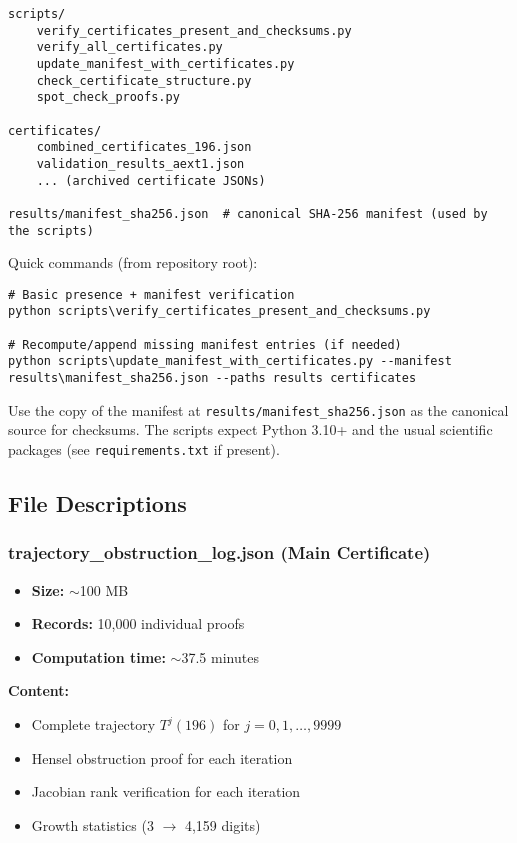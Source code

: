 \documentclass[11pt,a4paper]{article}
\theoremstyle{definition}
\begin{document}
\begin{lstlisting}[style=bashstyle,caption={Key verification paths and scripts}]
scripts/
    verify_certificates_present_and_checksums.py
    verify_all_certificates.py
    update_manifest_with_certificates.py
    check_certificate_structure.py
    spot_check_proofs.py

certificates/
    combined_certificates_196.json
    validation_results_aext1.json
    ... (archived certificate JSONs)

results/manifest_sha256.json  # canonical SHA-256 manifest (used by the scripts)
\end{lstlisting}

Quick commands (from repository root):

\begin{lstlisting}[style=bashstyle]
# Basic presence + manifest verification
python scripts\verify_certificates_present_and_checksums.py

# Recompute/append missing manifest entries (if needed)
python scripts\update_manifest_with_certificates.py --manifest results\manifest_sha256.json --paths results certificates
\end{lstlisting}

\begin{sloppypar}
Use the copy of the manifest at \texttt{results/manifest\_sha256.json} as the canonical source for checksums. The scripts expect Python 3.10+ and the usual scientific packages (see \texttt{requirements.txt} if present).
\end{sloppypar}

\subsection{File Descriptions}

\subsubsection{trajectory\_obstruction\_log.json (Main Certificate)}

\begin{itemize}[leftmargin=*]
    \item \textbf{Size:} $\sim$100 MB
    \item \textbf{Records:} 10,000 individual proofs
    \item \textbf{Computation time:} $\sim$37.5 minutes
\end{itemize}

\textbf{Content:}
\begin{itemize}
    \item Complete trajectory $T^j(196)$ for $j = 0, 1, \ldots, 9999$
    \item Hensel obstruction proof for each iteration
    \item Jacobian rank verification for each iteration
    \item Growth statistics (3 $\to$ 4,159 digits)
\end{itemize}
\end{document}
